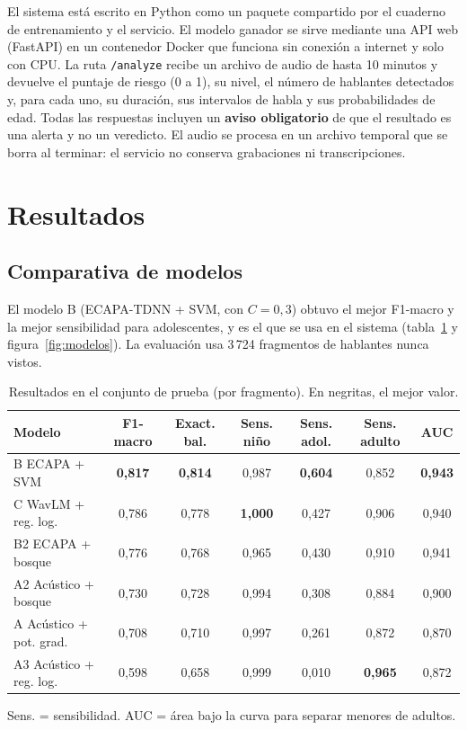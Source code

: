 \documentclass[11pt,a4paper]{article}
\begin{document}
El sistema está escrito en Python como un paquete compartido por el cuaderno de entrenamiento y el servicio. El modelo ganador se sirve mediante una API web (FastAPI) en un contenedor Docker que funciona sin conexión a internet y solo con CPU. La ruta \texttt{/analyze} recibe un archivo de audio de hasta 10 minutos y devuelve el puntaje de riesgo (0 a 1), su nivel, el número de hablantes detectados y, para cada uno, su duración, sus intervalos de habla y sus probabilidades de edad. Todas las respuestas incluyen un \textbf{aviso obligatorio} de que el resultado es una alerta y no un veredicto. El audio se procesa en un archivo temporal que se borra al terminar: el servicio no conserva grabaciones ni transcripciones.

\section{Resultados}

\subsection{Comparativa de modelos}

El modelo B (ECAPA-TDNN + SVM, con $C=0{,}3$) obtuvo el mejor F1-macro y la mejor sensibilidad para adolescentes, y es el que se usa en el sistema (tabla~\ref{tab:resultados} y figura~\ref{fig:modelos}). La evaluación usa 3\,724 fragmentos de hablantes nunca vistos.

\begin{table}[H]
\centering
\caption{Resultados en el conjunto de prueba (por fragmento). En negritas, el mejor valor.}
\label{tab:resultados}
\footnotesize
\setlength{\tabcolsep}{4pt}
\begin{tabular}{@{}lcccccc@{}}
\toprule
\textbf{Modelo} & \textbf{F1-macro} & \textbf{Exact. bal.} & \textbf{Sens. niño} & \textbf{Sens. adol.} & \textbf{Sens. adulto} & \textbf{AUC} \\
\midrule
B ECAPA + SVM          & \textbf{0,817} & \textbf{0,814} & 0,987 & \textbf{0,604} & 0,852 & \textbf{0,943} \\
C WavLM + reg. log.    & 0,786 & 0,778 & \textbf{1,000} & 0,427 & 0,906 & 0,940 \\
B2 ECAPA + bosque      & 0,776 & 0,768 & 0,965 & 0,430 & 0,910 & 0,941 \\
A2 Acústico + bosque   & 0,730 & 0,728 & 0,994 & 0,308 & 0,884 & 0,900 \\
A Acústico + pot. grad.& 0,708 & 0,710 & 0,997 & 0,261 & 0,872 & 0,870 \\
A3 Acústico + reg. log.& 0,598 & 0,658 & 0,999 & 0,010 & \textbf{0,965} & 0,872 \\
\bottomrule
\end{tabular}

\vspace{2pt}
{\footnotesize Sens. = sensibilidad. AUC = área bajo la curva para separar menores de adultos.}
\end{table}
\end{document}
